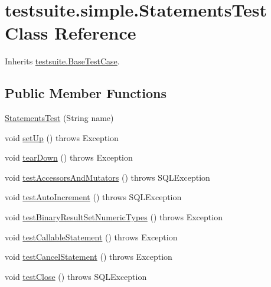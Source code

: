 \hypertarget{classtestsuite_1_1simple_1_1_statements_test}{}\section{testsuite.\+simple.\+Statements\+Test Class Reference}
\label{classtestsuite_1_1simple_1_1_statements_test}


Inherits \mbox{\hyperlink{classtestsuite_1_1_base_test_case}{testsuite.\+Base\+Test\+Case}}.

\subsection*{Public Member Functions}
\begin{DoxyCompactItemize}
\item 
\mbox{\hyperlink{classtestsuite_1_1simple_1_1_statements_test_a7cfee1c515cf25d0fa2f99e45a10c76b}{Statements\+Test}} (String name)
\item 
void \mbox{\hyperlink{classtestsuite_1_1simple_1_1_statements_test_a49ab77bad20dc259d9978a4f3566f2ae}{set\+Up}} ()  throws Exception 
\item 
void \mbox{\hyperlink{classtestsuite_1_1simple_1_1_statements_test_a99769a3bf4c9af2e19ac153633177043}{tear\+Down}} ()  throws Exception 
\item 
void \mbox{\hyperlink{classtestsuite_1_1simple_1_1_statements_test_a14f251093874f75fcc06d42b53c2fb1f}{test\+Accessors\+And\+Mutators}} ()  throws S\+Q\+L\+Exception 
\item 
void \mbox{\hyperlink{classtestsuite_1_1simple_1_1_statements_test_abf02e6d8b359939dafd7b1712e07be01}{test\+Auto\+Increment}} ()  throws S\+Q\+L\+Exception 
\item 
void \mbox{\hyperlink{classtestsuite_1_1simple_1_1_statements_test_a8686a9137f5901a701020342f04dc3a7}{test\+Binary\+Result\+Set\+Numeric\+Types}} ()  throws Exception 
\item 
void \mbox{\hyperlink{classtestsuite_1_1simple_1_1_statements_test_a575857630ae7ba0e8a97025a9d5d772f}{test\+Callable\+Statement}} ()  throws Exception 
\item 
void \mbox{\hyperlink{classtestsuite_1_1simple_1_1_statements_test_ae2be6d16cd76947ee5d58d3215b3e823}{test\+Cancel\+Statement}} ()  throws Exception 
\item 
void \mbox{\hyperlink{classtestsuite_1_1simple_1_1_statements_test_adf288077f570b0f532bdfedd6d04403d}{test\+Close}} ()  throws S\+Q\+L\+Exception 

\end{DoxyCompactItemize}
